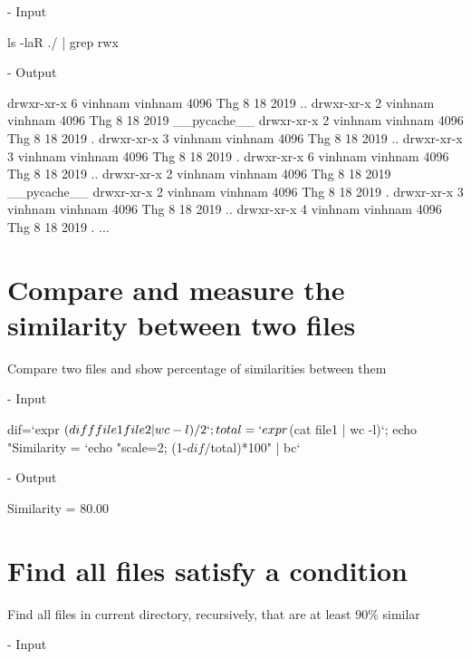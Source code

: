 \documentclass[10pt, a4paper]{article}
\begin{document}
\noindent - Input

\begin{verbbox}
ls -laR ./ | grep rwx
\end{verbbox}

\fbox{
\theverbbox
}

\noindent - Output

\begin{verbbox}
drwxr-xr-x 6 vinhnam vinhnam 4096 Thg 8 18  2019 ..
drwxr-xr-x 2 vinhnam vinhnam 4096 Thg 8 18  2019 __pycache__
drwxr-xr-x 2 vinhnam vinhnam 4096 Thg 8 18  2019 .
drwxr-xr-x 3 vinhnam vinhnam 4096 Thg 8 18  2019 ..
drwxr-xr-x 3 vinhnam vinhnam 4096 Thg 8 18  2019 .
drwxr-xr-x 6 vinhnam vinhnam 4096 Thg 8 18  2019 ..
drwxr-xr-x 2 vinhnam vinhnam 4096 Thg 8 18  2019 __pycache__
drwxr-xr-x 2 vinhnam vinhnam 4096 Thg 8 18  2019 .
drwxr-xr-x 3 vinhnam vinhnam 4096 Thg 8 18  2019 ..
drwxr-xr-x 4 vinhnam vinhnam 4096 Thg 8 18  2019 .
...
\end{verbbox}

\fbox{
\theverbbox
}

\section{Compare and measure the similarity between two files}

Compare two files and show percentage of similarities between them

\noindent - Input

\begin{verbbox}
dif=`expr $(diff file1 file2 | wc -l) / 2`; total=`expr $(cat file1 | wc -l)`; 
echo "Similarity = `echo "scale=2; (1-$dif/$total)*100" | bc` %
\end{verbbox}

\fbox{
\theverbbox
}

\noindent - Output

\begin{verbbox}
Similarity = 80.00 %
\end{verbbox}

\fbox{
\theverbbox
}

\section{Find all files satisfy a condition}

Find all files in current directory, recursively, that are at least 90\% similar

\noindent - Input
\end{document}
